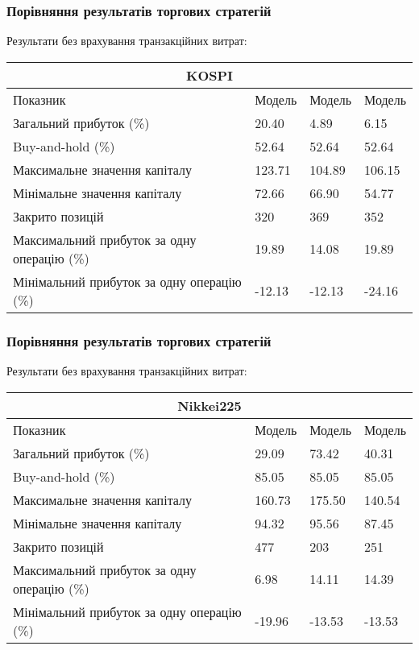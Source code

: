 \documentclass[aspectratio=169]{beamer}
\begin{document}
\begin{frame}
\frametitle{Порівняння результатів торгових стратегій}
Результати без врахування транзакційних витрат:\\
\bigskip
\begin{tabular}{ |p{7.8cm}||p{1.6cm}|p{1.6cm}|p{1.6cm}|  }
 \hline
 \multicolumn{4}{|c|}{KOSPI} \\
 \hline
 Показник& Модель #1 &Модель #2&Модель #3\\
 \hline
 Загальний прибуток (\%)&\cellcolor{pink!25}20.40&	\cellcolor{pink!25}4.89&	\cellcolor{pink!25}6.15\\
 Buy-and-hold (\%) & \cellcolor{blue!8}52.64 &\cellcolor{blue!8}52.64& \cellcolor{blue!8}52.64\\
 Максимальне значення капіталу &123.71&	104.89&	106.15	\\
Мінімальне значення капіталу&	72.66&	66.90&	54.77\\
Закрито позицій&	320&	369	&352\\
Максимальний прибуток за одну операцію (\%)&19.89&	14.08&	19.89	\\
Мінімальний прибуток за одну операцію (\%)&	-12.13&	-12.13&	-24.16\\
 \hline
\end{tabular}
\end{frame}

\begin{frame}
\frametitle{Порівняння результатів торгових стратегій}
Результати без врахування транзакційних витрат:\\
\bigskip
\begin{tabular}{ |p{7.8cm}||p{1.6cm}|p{1.6cm}|p{1.6cm}|  }
 \hline
 \multicolumn{4}{|c|}{Nikkei225} \\
 \hline
 Показник& Модель #1 &Модель #2&Модель #3\\
 \hline
 Загальний прибуток (\%)& \cellcolor{pink!25}29.09	&\cellcolor{pink!25}73.42&	\cellcolor{pink!25}40.31\\
 Buy-and-hold (\%) & \cellcolor{blue!8}85.05 &\cellcolor{blue!8}85.05& \cellcolor{blue!8}85.05\\
 Максимальне значення капіталу &	160.73&	175.50&	140.54\\
Мінімальне значення капіталу&	94.32&	95.56	&87.45\\
Закрито позицій&	477&	203	&251\\
Максимальний прибуток за одну операцію (\%)&6.98	&14.11&	14.39	\\
Мінімальний прибуток за одну операцію (\%)&	-19.96&	-13.53&	-13.53\\
 \hline
\end{tabular}
\end{frame}
\end{document}
